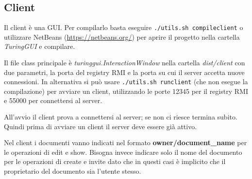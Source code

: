 \documentclass[a4paper]{article}
\theoremstyle{theorem}
\theoremstyle{remark}
\theoremstyle{definition}
\theoremstyle{corollary}
\theoremstyle{lemma}
\begin{document}
\subsection{Client}
Il client è una GUI. Per compilarlo basta eseguire \texttt{./utils.sh compileclient} o utilizzare NetBeans (\url{https://netbeans.org/}) per aprire il progetto nella cartella \textit{TuringGUI} e compilare.

Il file class principale è \textit{turinggui.InteractionWindow} nella cartella \textit{dist/client} con due parametri, la porta del registry RMI e la porta su cui il server accetta nuove connessioni.
In alternativa si può usare \texttt{./utils.sh runclient} (che non esegue la compilazione) per avviare un client, utilizzando le porte 12345 per il registry RMI e 55000 per connettersi al server.

All'avvio il client prova a connettersi al server; se non ci riesce termina subito. Quindi prima di avviare un client il server deve essere già attivo.

Nel client i documenti vanno indicati nel formato \textbf{owner/document\_name} per le operazioni di edit e show. Bisogna invece indicare solo il nome del documento per le operazioni di create e invite dato che in questi casi è implicito che il proprietario del documento sia l'utente stesso.
\end{document}
